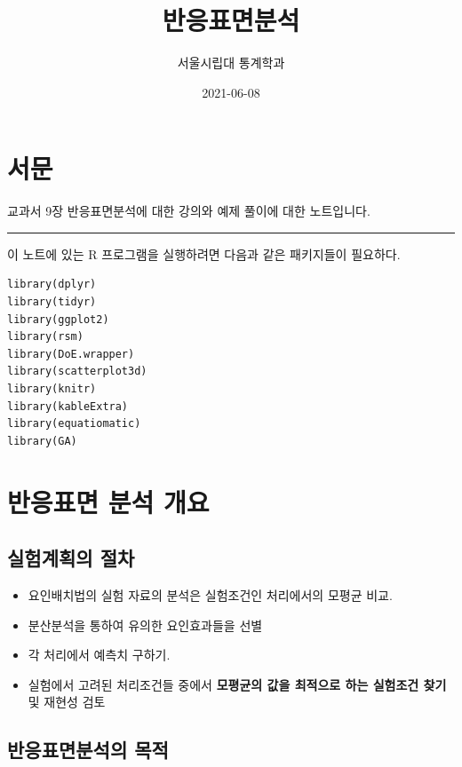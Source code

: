 \documentclass[
]{book}
\title{반응표면분석}
\author{서울시립대 통계학과}
\date{2021-06-08}
\theoremstyle{definition}
\theoremstyle{definition}
\theoremstyle{definition}
\theoremstyle{definition}
\theoremstyle{remark}
\begin{document}
\maketitle

{
\setcounter{tocdepth}{1}
\tableofcontents
}
\hypertarget{uxc11cuxbb38}{%
\chapter*{서문}\label{uxc11cuxbb38}}


교과서 9장 반응표면분석에 대한 강의와 예제 풀이에 대한 노트입니다.

\begin{center}\rule{0.5\linewidth}{0.5pt}\end{center}

이 노트에 있는 R 프로그램을 실행하려면 다음과 같은 패키지들이 필요하다.

\begin{verbatim}
library(dplyr)
library(tidyr)
library(ggplot2)
library(rsm)
library(DoE.wrapper)
library(scatterplot3d)
library(knitr)
library(kableExtra)
library(equatiomatic)
library(GA)
\end{verbatim}

\mainmatter

\hypertarget{responseintro}{%
\chapter{반응표면 분석 개요}\label{responseintro}}

\hypertarget{uxc2e4uxd5d8uxacc4uxd68duxc758-uxc808uxcc28}{%
\section{실험계획의 절차}\label{uxc2e4uxd5d8uxacc4uxd68duxc758-uxc808uxcc28}}

\begin{itemize}
\item
  요인배치법의 실험 자료의 분석은 실험조건인 처리에서의 모평균 비교.
\item
  분산분석을 통하여 유의한 요인효과들을 선별
\item
  각 처리에서 예측치 구하기.
\item
  실험에서 고려된 처리조건들 중에서 \textbf{모평균의 값을 최적으로 하는 실험조건 찾기} 및 재현성 검토
\end{itemize}

\hypertarget{uxbc18uxc751uxd45cuxba74uxbd84uxc11duxc758-uxbaa9uxc801}{%
\section{반응표면분석의 목적}\label{uxbc18uxc751uxd45cuxba74uxbd84uxc11duxc758-uxbaa9uxc801}}
\end{document}
